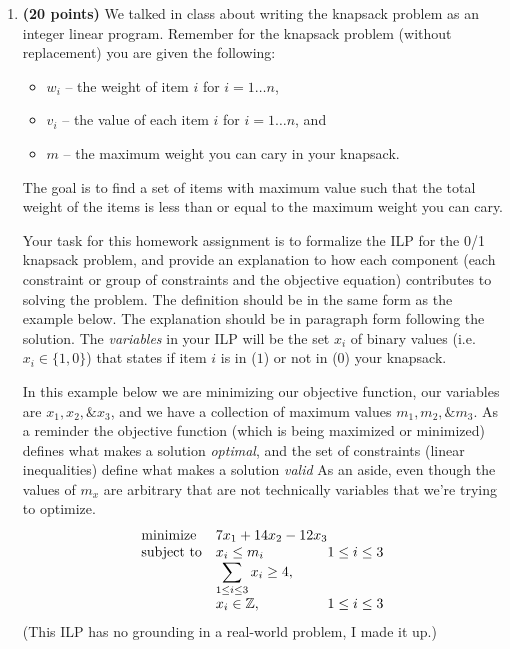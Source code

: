 \documentclass[11pt, oneside]{article}   	%
\begin{document}
\begin{enumerate}
\item \textbf{(20 points)} 
We talked in class about writing the knapsack problem as an integer linear program. 
Remember for the knapsack problem (without replacement) you are given the following:
\begin{itemize}
\item $w_{i}$ -- the weight of item $i$ for $i = 1 \dots n$, 
\item $v_{i}$ -- the value of each item $i$ for $i = 1 \dots n$, and 
\item $m$ -- the maximum weight you can cary in your knapsack. 
\end{itemize}

The goal is to find a set of items with maximum value such that the total weight of the items is less than or equal to the maximum weight you can cary. 

Your task for this homework assignment is to formalize the ILP for the 0/1 knapsack problem, 
and provide an explanation to how each component (each constraint or group of constraints and the objective equation) 
contributes to solving the problem. 
The definition should be in the same form as the example below. 
The explanation should be in paragraph form following the solution. 
The \emph{variables} in your ILP will be the set $x_{i}$ of binary values (i.e. $x_{i} \in \{1,0\}$) that states if item $i$ is in ($1$) or not in ($0$) your knapsack.

\begin{tcolorbox}[colback=blue!5,colframe=blue!75!black,title=Writing down an ILP] 
In this example below we are minimizing our objective function, our variables are $x_{1}, x_{2}, \& x_{3}$, and we have a collection of maximum values $m_{1}, m_{2}, \& m_{3}$. 
As a reminder the objective function (which is being maximized or minimized) defines what makes a solution \emph{optimal}, 
and the set of constraints (linear inequalities) define what makes a solution \emph{valid}
As an aside, even though the values of $m_{x}$ are arbitrary that are not technically variables that we're trying to optimize. 
\begin{equation*}
\begin{array}{ll@{}ll}
\text{minimize}  & 7 x_{1} + 14 x_{2} - 12 x_{3} \\
\text{subject to}& x_{i} \leq m_{i}  &1 \le i \le 3\\
			& \displaystyle\sum_{1 \le i \le 3}  x_{i} \geq 4,  &\\
			& x_{i} \in \mathbb{Z}, &1 \le i \le 3
\end{array}
\end{equation*}
(This ILP has no grounding in a real-world problem, I made it up.) 


\end{tcolorbox}
\end{enumerate}
\end{document}
